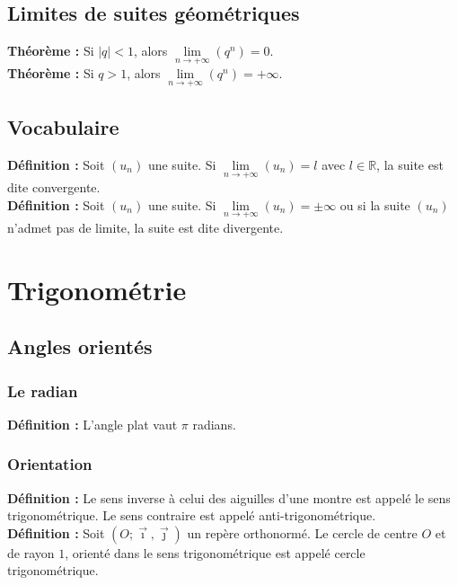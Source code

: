 \documentclass[a4paper,titlepage]{article}
\let\oldsection\section
\renewcommand\section{\clearpage\oldsection}
\begin{document}
    \subsection{Limites de suites géométriques}
        \textbf{Théorème :} Si $\left|q\right|<1$, alors $\lim\limits_{n\to+\infty}\left(q^{n}\right)=0$.
        \\
        \textbf{Théorème :} Si $q>1$, alors $\lim\limits_{n\to+\infty}\left(q^{n}\right)=+\infty$.
    \subsection{Vocabulaire}
        \textbf{Définition :} Soit $\left(u_{n}\right)$ une suite. Si $\lim\limits_{n\to+\infty}\left(u_{n}\right)=l$ avec $l\in\mathbb{R}$, la suite est dite convergente.
        \\
        \textbf{Définition :} Soit $\left(u_{n}\right)$ une suite. Si $\lim\limits_{n\to+\infty}\left(u_{n}\right)=\pm\infty$ ou si la suite $\left(u_{n}\right)$ n’admet pas de limite, la suite est dite divergente.
\section{Trigonométrie}
    \subsection{Angles orientés}
        \subsubsection{Le radian}
            \textbf{Définition :} L’angle plat vaut $\pi$ radians.
        \subsubsection{Orientation}
            \textbf{Définition :} Le sens inverse à celui des aiguilles d’une montre est appelé le sens trigonométrique. Le sens contraire est appelé anti-trigonométrique.
            \\
            \textbf{Définition :} Soit $\left(O;\vec{\imath},\vec{\jmath}\right)$ un repère orthonormé. Le cercle de centre $O$ et de rayon $1$, orienté dans le sens trigonométrique est appelé cercle trigonométrique.
\end{document}
